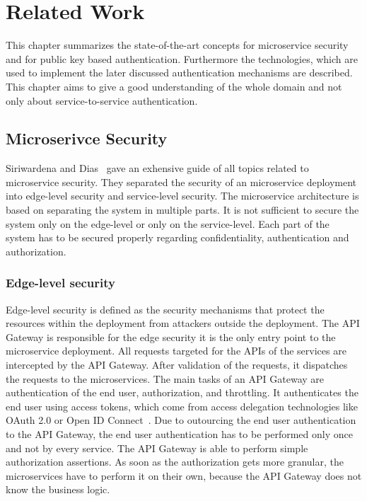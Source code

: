 \chapter{Related Work}
\label{cha:Related_Work}
This chapter summarizes the state-of-the-art concepts for microservice security and for public key based authentication.
Furthermore the technologies, which are used to implement the later discussed authentication mechanisms are described.
This chapter aims to give a good understanding of the whole domain and not only about service-to-service authentication.

\section{Microserivce Security}
Siriwardena and Dias~\cite{dias2020microservices} gave an exhensive guide of all topics related to microservice security. 
They separated the security of an microservice deployment into edge-level security and service-level security.
The microservice architecture is based on separating the system in multiple parts.
It is not sufficient to secure the system only on the edge-level or only on the service-level.
Each part of the system has to be secured properly regarding confidentiality, authentication and authorization.

\subsection{Edge-level security}
Edge-level security is defined as the security mechanisms that protect the resources within the deployment from attackers outside the deployment.
The API Gateway is responsible for the edge security it is the only entry point to the microservice deployment.
All requests targeted for the APIs of the services are intercepted by the API Gateway.
After validation of the requests, it dispatches the requests to the microservices.
The main tasks of an API Gateway are authentication of the end user, authorization, and throttling.
It authenticates the end user using access tokens, which come from access delegation technologies like OAuth 2.0 or Open ID Connect~\cite{siriwardena2014advanced}.
Due to outourcing the end user authentication to the API Gateway, the end user authentication has to be performed only once and not by every service.
The API Gateway is able to perform simple authorization assertions. 
As soon as the authorization gets more granular, the microservices have to perform it on their own, because the API Gateway does not know the business logic.

